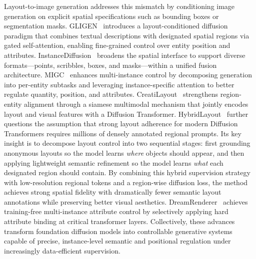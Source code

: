\documentclass{llmxive}
\begin{document}
Layout-to-image generation addresses this mismatch by conditioning image generation on explicit spatial specifications such as bounding boxes or segmentation masks. GLIGEN~\citep{li2023gligen} introduces a layout-conditioned diffusion paradigm that combines textual descriptions with designated spatial regions via gated self-attention, enabling fine-grained control over entity position and attributes. InstanceDiffusion~\citep{wang2024instancediffusion} broadens the spatial interface to support diverse formats---points, scribbles, boxes, and masks---within a unified fusion architecture. MIGC~\citep{zhou2024migc} enhances multi-instance control by decomposing generation into per-entity subtasks and leveraging instance-specific attention to better regulate quantity, position, and attributes. CreatiLayout~\citep{CreatiLayout} strengthens region-entity alignment through a siamese multimodal mechanism that jointly encodes layout and visual features with a Diffusion Transformer. HybridLayout~\citep{wu2025hybrid} further questions the assumption that strong layout adherence for modern Diffusion Transformers requires millions of densely annotated regional prompts. Its key insight is to decompose layout control into two sequential stages: first grounding anonymous layouts so the model learns \emph{where} objects should appear, and then applying lightweight semantic refinement so the model learns \emph{what} each designated region should contain. By combining this hybrid supervision strategy with low-resolution regional tokens and a region-wise diffusion loss, the method achieves strong spatial fidelity with dramatically fewer semantic layout annotations while preserving better visual aesthetics. DreamRenderer~\citep{zhou2025dreamrenderer} achieves training-free multi-instance attribute control by selectively applying hard attribute binding at critical transformer layers. Collectively, these advances transform foundation diffusion models into controllable generative systems capable of precise, instance-level semantic and positional regulation under increasingly data-efficient supervision.
\end{document}
